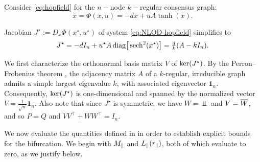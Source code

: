 \documentclass[letterpaper, 10 pt, conference]{ieeeconf}
\begin{document}
Consider \eqref{eq:hopfield} for the \(n-\)node \(k-\)regular consensus graph:
\begin{equation}
    \dot{x} = \Phi(x,u) = -dx + uA\tanh(x). \label{eq:NLOD-hopfield}
\end{equation}

Jacobian \(J^{\star} := D_{x}\Phi(x^{\star},u^{\star})\) of system \eqref{eq:NLOD-hopfield} simplifies to
\begin{equation}
    J^{\star} = -dI_{n}+u^{\star}A\,\mathrm{diag}\big[\operatorname{sech}^2(x^{\star})\big] = \tfrac{d}{k}(A-kI_{n}). \label{eq:jac_Hopfield_NOD}
\end{equation}

We first characterize the orthonormal basis matrix \(V\) of \(\ker(J^{\star})\). By the Perron--Frobenius theorem \cite[Theorem~8.4.4]{horn2012matrix}, the adjacency matrix \(A\) of a \(k\)-regular, irreducible graph admits a simple largest eigenvalue \(k\), with associated eigenvector \(\mathbf{1}_{n}\). Consequently, \(\ker(J^{\star})\) is one-dimensional and spanned by the normalized vector \(V = \tfrac{1}{\sqrt{n}}\mathbf{1}_{n}\). Also note that since \(J^{\star}\) is symmetric, we have \(W = \Vbar\) and \(V = \overline{W}\), and so \(P = Q\) and \(VV^{\top} + WW^{\top} = I_{n}\).

We now evaluate the quantities defined in  in order to establish explicit bounds for the bifurcation.
We begin with \(M_{\parallel}\) and \(L_{\parallel}(r_{\parallel})\), both of which evaluate to zero, as we justify below.
\end{document}
